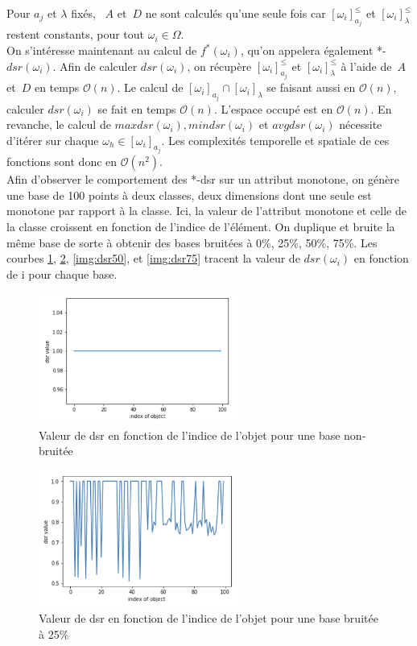 \documentclass[a4paper]{article}
\begin{document}
Pour $a_j$ et $\lambda$ fixés, ~$A$ et~$D$ ne sont calculés qu'une seule fois car
$[\omega_i]^{\leq}_{a_j}$ et $[\omega_i]^{\leq}_{\lambda}$ restent constants,
pour tout $\omega_i \in \Omega$. \\

On s'intéresse maintenant au calcul de $f^*(\omega_i)$, qu'on appelera également
*-$dsr(\omega_i)$.
Afin de calculer $dsr(\omega_i)$, on récupère $[\omega_i]^{\leq}_{a_j}$ et
$[\omega_i]^{\leq}_{\lambda}$ à l'aide de~$A$ et~$D$ en temps $\mathcal{O}(n)$. Le calcul de
$[\omega_i]_{a_j} \cap [\omega_i]_{\lambda}$ se faisant aussi en $\mathcal{O}(n)$,
calculer $dsr(\omega_i)$ se fait en temps $\mathcal{O}(n)$. L'espace occupé est
en $\mathcal{O}(n)$.
En revanche, le calcul de $maxdsr(\omega_i), mindsr(\omega_i)$ et
$avgdsr(\omega_i)$ nécessite d'itérer sur chaque $\omega_h \in
[\omega_i]_{a_j}$. Les complexités temporelle et spatiale de ces fonctions sont
donc en $\mathcal{O}(n^2).$ \\

Afin d'observer le comportement des *-dsr sur un attribut monotone, on génère
une base de 100 points à deux classes, deux dimensions dont une seule est
monotone par rapport à la classe.  Ici, la valeur de l'attribut monotone et
celle de la classe croissent en fonction de l'indice de l'élément. On duplique
et bruite la même base de sorte à obtenir des bases bruitées à 0\%, 25\%, 50\%,
75\%.  Les courbes \ref{img:dsr0}, \ref{img:dsr25}, \ref{img:dsr50}, et
\ref{img:dsr75} tracent la valeur de $dsr(\omega_i)$ en fonction de i pour
chaque base. \\

\begin{figure}[H]
	\center 
	\includegraphics[width=0.6\textwidth]{images/dsr_0.png}
    \caption{Valeur de dsr en fonction de l'indice de l'objet pour une base
    non-bruitée}
    \label{img:dsr0}
\end{figure}

\begin{figure}[H]
	\center 
	\includegraphics[width=0.6\textwidth]{images/dsr_25.png}
    \caption{Valeur de dsr en fonction de l'indice de l'objet pour une base
    bruitée à 25\%}
    \label{img:dsr25}
\end{figure}
\end{document}
